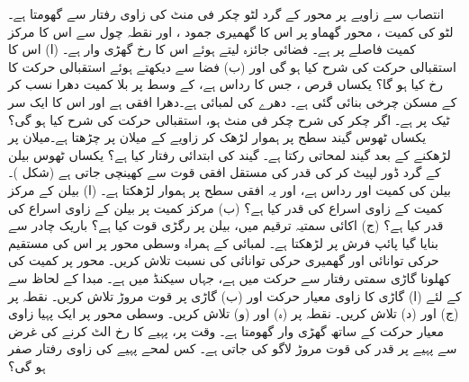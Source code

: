 انتصاب سے  زاویے پر محور کے گرد لٹو  چکر فی منٹ کی زاوی رفتار سے گھومتا ہے۔ لٹو کی کمیت ، محور گھماو پر اس کا گھمیری جمود ، اور نقطہ چول سے اس کا مرکز کمیت  فاصلے پر ہے۔ فضائی جائزہ لیتے ہوئے اس کا رخ گھڑی وار ہے۔ (ا) اس کا استقبالی حرکت کی شرح کیا ہو گی اور (ب) فضا سے دیکھتے ہوئے استقبالی حرکت کا رخ کیا ہو گا؟
یکساں قرص ، جس کا رداس   ہے،   کے وسط پر بلا کمیت دھرا نسب کر کے مسکن چرخی  بنائی گئی ہے۔ دھرے
 کی لمبائی  ہے۔دھرا افقی  ہے اور اس کا ایک سر  ٹیک پر ہے۔ اگر چکر کی شرح  چکر فی منٹ ہو، استقبالی حرکت کی شرح کیا ہو گی؟
یکساں ٹھوس گیند سطح پر ہموار لڑھک کر  زاویے کے  میلان پر چڑھتا ہے۔میلان پر  لڑھکنے کے بعد گیند لمحاتی رکتا ہے۔ گیند کی ابتدائی رفتار کیا ہے؟
یکساں ٹھوس بیلن کے گرد ڈور لپیٹ کر   کی قدر کی مستقل  افقی قوت  سے کھینچی جاتی ہے (شکل )۔ بیلن کی کمیت  اور  رداس  ہے، اور یہ افقی سطح پر ہموار لڑھکتا ہے۔ (ا)  بیلن کے  مرکز کمیت  کے زاوی اسراع کی قدر کیا  ہے؟ (ب)  مرکز کمیت پر بیلن کے زاوی اسراع کی قدر کیا ہے؟ (ج)  اکائی سمتیہ ترقیم میں،  بیلن پر رگڑی قوت کیا ہے؟
باریک چادر سے بنایا گیا پائپ  فرش پر لڑھکتا ہے۔ لمبائی کے ہمراہ وسطی محور پر اس کی مستقیم حرکی توانائی اور گھمیری حرکی توانائی کی نسبت تلاش کریں۔
محور  پر کمیت   کی کھلونا گاڑی  سمتی رفتار  سے حرکت میں ہے، جہاں  سیکنڈ میں ہے۔ مبدا کے لحاظ سے  کے لئے  (ا) گاڑی کا زاوی معیار حرکت  اور (ب) گاڑی پر   قوت مروڑ  تلاش کریں۔ نقطہ  پر (ج)  اور (د)  تلاش کریں۔
 نقطہ  پر (ہ)  اور (و)  تلاش کریں۔
وسطی محور پر ایک پہیا  زاوی معیار حرکت  کے ساتھ  گھڑی وار گھومتا ہے۔ وقت  پر، پہیے کا رخ  الٹ  کرنے  کی غرض سے پہیے پر  قدر کی قوت مروڑ لاگو کی جاتی ہے۔ کس   لمحے       پہیے کی زاوی رفتار صفر ہو گی؟
